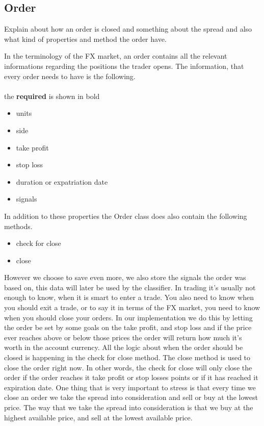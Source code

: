 \subsection{Order}
Explain about how an order is closed and something about the spread and also what kind of properties and method the order have.

In the terminology of the FX market, an order contains all the relevant informations regarding the positions the trader opens. The information, that every order needs to have is the following.
\\
\\
the \textbf{required} is shown in bold
\begin{itemize}
\item{units}
\item{side}
\item{take profit}
\item{stop loss}
\item{duration or expatriation date}
\item{signals}
\end{itemize}

In addition to these properties the Order class does also contain the following methods.
\begin{itemize}
\item{check for close}
\item{close}
\end{itemize}

However we choose to save even more, we also store the signals the order was based on, this data will later be used by the classifier. 
In trading it's usually not enough to know, when it is smart to enter a trade. You also need to know when you should exit a trade, or to say it in terms of the FX market, you need to know when you should close your orders. In our implementation we do this by letting the order be set by some goals on the take profit, and stop loss and if the price ever reaches above or below those prices the order will return how much it's worth in the account currency. All the logic about when the order should be closed is happening in the check for close method. The close method is used to close the order right now. In other words, the check for close will only close the order if the order reaches it take profit or stop losses points or if it has reached it expiration date.
One thing that is very important to stress is that every time we close an order we take the spread into consideration and sell or buy at the lowest price. The way that we take the spread into consideration is that we buy at the highest available price, and sell at the lowest available price.

